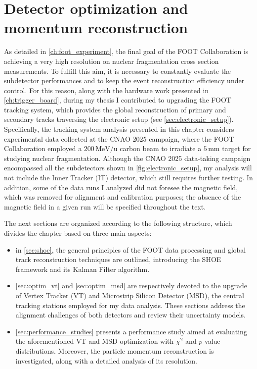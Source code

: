 \chapter{Detector optimization and momentum reconstruction}\label{ch:analysis_vt_msd_momentum}
As detailed in \autoref{ch:foot_experiment}, the final goal of the FOOT Collaboration is achieving a very high resolution on nuclear fragmentation cross section measurements. To fulfill this aim, it is necessary to constantly evaluate the subdetector performances and to keep the event reconstruction efficiency under control. For this reason, along with the hardware work presented in \autoref{ch:trigger_board}, during my thesis I contributed to upgrading the FOOT tracking system, which provides the global reconstruction of primary and secondary tracks traversing the electronic setup (see \autoref{sec:electronic_setup}). Specifically, the tracking system analysis presented in this chapter considers experimental data collected at the CNAO 2025 campaign, where the FOOT Collaboration employed a $200\,\mathrm{MeV/u}$ carbon beam to irradiate a $5\,\mathrm{mm}$  target for studying nuclear fragmentation. Although the CNAO 2025 data-taking campaign encompassed all the subdetectors shown in \autoref{fig:electronic_setup}, my analysis will not include the Inner Tracker (IT) detector, which still requires further testing. In addition, some of the data runs I analyzed did not foresee the magnetic field, which was removed for alignment and calibration purposes; the absence of the magnetic field in a given run will be specified throughout the text.

The next sections are organized according to the following structure, which divides the chapter based on three main aspects:
\begin{itemize}
	\item in \autoref{sec:shoe}, the general principles of the FOOT data processing and global track reconstruction techniques are outlined, introducing the SHOE framework and its Kalman Filter algorithm.
	\item \autoref{sec:optim_vt} and \autoref{sec:optim_msd} are respectively devoted to the upgrade of Vertex Tracker (VT) and Microstrip Silicon Detector (MSD), the central tracking stations employed for my data analysis. These sections address the alignment challenges of both detectors and review their uncertainty models.
	\item \autoref{sec:performance_studies} presents a performance study aimed at evaluating the aforementioned VT and MSD optimization with $\chi^2$ and $p$-value distributions. Moreover, the particle momentum reconstruction is investigated, along with a detailed analysis of its resolution.
\end{itemize}
